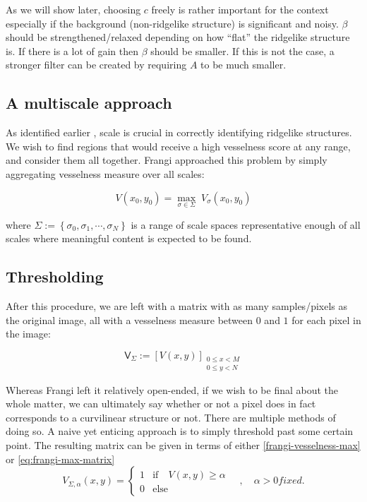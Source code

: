 As we will show later, choosing $c$ freely is rather important for the context especially if the background (non-ridgelike structure) is significant and noisy. $\beta$ should be strengthened/relaxed depending on how ``flat'' the ridgelike structure is. If there is a lot of gain  then $\beta$ should be smaller. If this is not the case, a stronger filter can be created by requiring $A$ to be much smaller.

\subsection{A multiscale approach}

As identified earlier , scale is crucial in correctly identifying ridgelike structures. We wish to find regions that would receive a high vesselness score at any range, and consider them all together. Frangi \cite{frangi1998multiscale} approached this problem by simply aggregating vesselness measure over all scales:

\begin{equation} \label{frangi-vesselness-max}
V(x_0, y_0) = \underset{\sigma \in \Sigma}{\max}\;  V_\sigma(x_0, y_0)
\end{equation}

where $\Sigma := \left\{ \sigma_0, \sigma_1 , \cdots, \sigma_N \right\}$ is a range of scale spaces representative enough of all scales where meaningful content is expected to be found.

\subsection{Thresholding}

After this procedure, we are left with a matrix with as many samples/pixels as the original image, all with a vesselness measure between $0$ and $1$ for each pixel in the image:

\begin{equation} \label{eq:frangi-max-matrix}
\mathsf{V}_\Sigma := \left[ V(x, y)\right]_{\substack{0\le x<M \\ 0\le y<N}}
\end{equation}

Whereas Frangi \cite{frangi1998multiscale} left it relatively open-ended, if we wish to be final about the whole matter, we can ultimately say whether or not a pixel does in fact corresponds to a curvilinear structure or not. There are multiple methods of doing so. A naive yet enticing approach is to simply threshold past some certain point. The resulting matrix can be given in terms of either \cref{frangi-vesselness-max} or \cref{eq:frangi-max-matrix}
\begin{equation}
V_{\Sigma,\alpha}(x,y) = \begin{cases}
	1 & \textrm{if}\quad V(x,y) \ge \alpha \\
	0 & \textrm{else}
\end{cases}  \quad , \quad \alpha > 0 fixed.
\end{equation}


